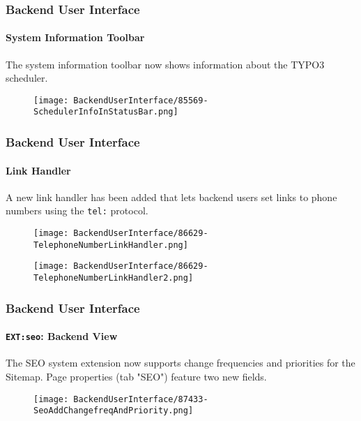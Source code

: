 
\begin{frame}[fragile]
	\frametitle{Backend User Interface}
	\framesubtitle{System Information Toolbar}

	The system information toolbar now shows information about the TYPO3 scheduler.

	\begin{figure}
		\texttt{[image: BackendUserInterface/85569-SchedulerInfoInStatusBar.png]}
	\end{figure}

\end{frame}


\begin{frame}[fragile]
	\frametitle{Backend User Interface}
	\framesubtitle{Link Handler}

	A new link handler has been added that lets backend users set links to phone
    numbers using the \texttt{tel:} protocol.

	\begin{figure}
		\texttt{[image: BackendUserInterface/86629-TelephoneNumberLinkHandler.png]}
	\end{figure}

	\begin{figure}
		\texttt{[image: BackendUserInterface/86629-TelephoneNumberLinkHandler2.png]}
	\end{figure}

\end{frame}


\begin{frame}[fragile]
	\frametitle{Backend User Interface}
	\framesubtitle{\texttt{EXT:seo}: Backend View}

	The SEO system extension now supports change frequencies and priorities for the Sitemap.
	Page properties (tab "SEO") feature two new fields.

	\begin{figure}
		\texttt{[image: BackendUserInterface/87433-SeoAddChangefreqAndPriority.png]}
	\end{figure}

\end{frame}

